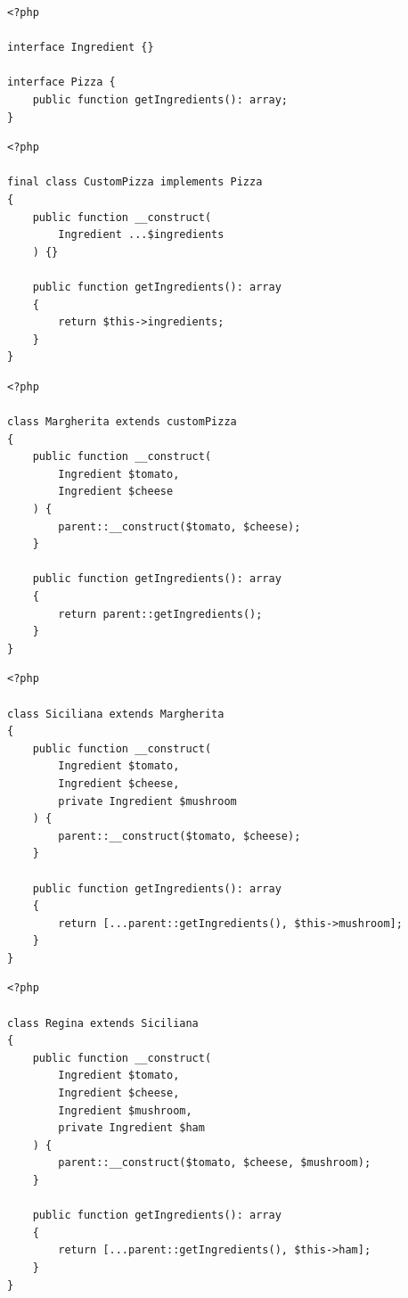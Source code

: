 \begin{frame}[fragile,c]
    \begin{lstlisting}
<?php

interface Ingredient {}

interface Pizza {
    public function getIngredients(): array;
}
    \end{lstlisting}
\end{frame}

\begin{frame}[fragile,c]
    \begin{lstlisting}
<?php

final class CustomPizza implements Pizza
{
    public function __construct(
        Ingredient ...$ingredients
    ) {}

    public function getIngredients(): array
    {
        return $this->ingredients;
    }
}
    \end{lstlisting}
\end{frame}

\begin{frame}[fragile,c]
    \begin{lstlisting}
<?php

class Margherita extends customPizza
{
    public function __construct(
        Ingredient $tomato,
        Ingredient $cheese
    ) {
        parent::__construct($tomato, $cheese);
    }

    public function getIngredients(): array
    {
        return parent::getIngredients();
    }
}
    \end{lstlisting}
\end{frame}

\begin{frame}[fragile,c]
    \begin{lstlisting}
<?php

class Siciliana extends Margherita
{
    public function __construct(
        Ingredient $tomato,
        Ingredient $cheese,
        private Ingredient $mushroom
    ) {
        parent::__construct($tomato, $cheese);
    }

    public function getIngredients(): array
    {
        return [...parent::getIngredients(), $this->mushroom];
    }
}
    \end{lstlisting}
\end{frame}

\begin{frame}[fragile,c]
    \begin{lstlisting}
<?php

class Regina extends Siciliana
{
    public function __construct(
        Ingredient $tomato,
        Ingredient $cheese,
        Ingredient $mushroom,
        private Ingredient $ham
    ) {
        parent::__construct($tomato, $cheese, $mushroom);
    }

    public function getIngredients(): array
    {
        return [...parent::getIngredients(), $this->ham];
    }
}
    \end{lstlisting}
\end{frame}

